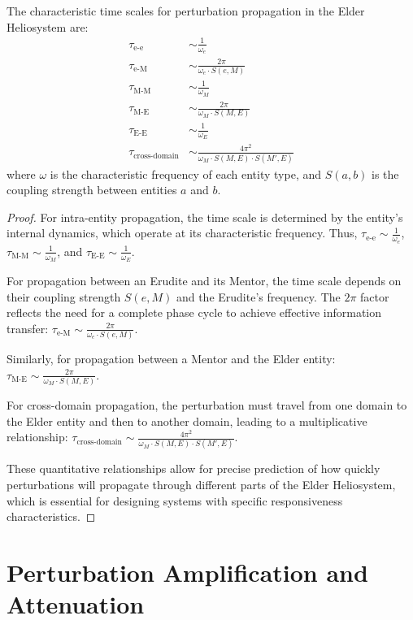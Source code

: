 \begin{theorem}
The characteristic time scales for perturbation propagation in the Elder Heliosystem are:
\begin{align}
\tau_{\text{e-e}} &\sim \frac{1}{\omega_e} \\
\tau_{\text{e-M}} &\sim \frac{2\pi}{\omega_e \cdot S(e,M)} \\
\tau_{\text{M-M}} &\sim \frac{1}{\omega_M} \\
\tau_{\text{M-E}} &\sim \frac{2\pi}{\omega_M \cdot S(M,E)} \\
\tau_{\text{E-E}} &\sim \frac{1}{\omega_E} \\
\tau_{\text{cross-domain}} &\sim \frac{4\pi^2}{\omega_M \cdot S(M,E) \cdot S(M',E)}
\end{align}
where $\omega$ is the characteristic frequency of each entity type, and $S(a,b)$ is the coupling strength between entities $a$ and $b$.
\end{theorem}

\begin{proof}
For intra-entity propagation, the time scale is determined by the entity's internal dynamics, which operate at its characteristic frequency. Thus, $\tau_{\text{e-e}} \sim \frac{1}{\omega_e}$, $\tau_{\text{M-M}} \sim \frac{1}{\omega_M}$, and $\tau_{\text{E-E}} \sim \frac{1}{\omega_E}$.

For propagation between an Erudite and its Mentor, the time scale depends on their coupling strength $S(e,M)$ and the Erudite's frequency. The $2\pi$ factor reflects the need for a complete phase cycle to achieve effective information transfer: $\tau_{\text{e-M}} \sim \frac{2\pi}{\omega_e \cdot S(e,M)}$.

Similarly, for propagation between a Mentor and the Elder entity: $\tau_{\text{M-E}} \sim \frac{2\pi}{\omega_M \cdot S(M,E)}$.

For cross-domain propagation, the perturbation must travel from one domain to the Elder entity and then to another domain, leading to a multiplicative relationship: $\tau_{\text{cross-domain}} \sim \frac{4\pi^2}{\omega_M \cdot S(M,E) \cdot S(M',E)}$.

These quantitative relationships allow for precise prediction of how quickly perturbations will propagate through different parts of the Elder Heliosystem, which is essential for designing systems with specific responsiveness characteristics.
\end{proof}

\section{Perturbation Amplification and Attenuation}

